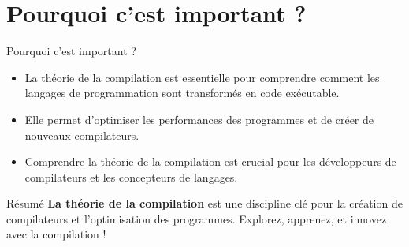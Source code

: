 \documentclass{clbeamer2024}
\begin{document}
	\section{Pourquoi c'est important ?}
	\begin{frame}{Pourquoi c'est important ?}
		\begin{itemize}
			\item La théorie de la compilation est essentielle pour comprendre comment les langages de programmation sont transformés en code exécutable.
			\item Elle permet d'optimiser les performances des programmes et de créer de nouveaux compilateurs.
			\item Comprendre la théorie de la compilation est crucial pour les développeurs de compilateurs et les concepteurs de langages.
		\end{itemize}
	\end{frame}
	
	\begin{frame}{Résumé}
		\textbf{La théorie de la compilation} est une discipline clé pour la création de compilateurs et l'optimisation des programmes.  
		Explorez, apprenez, et innovez avec la compilation !
	\end{frame}


	
	
\end{document}
